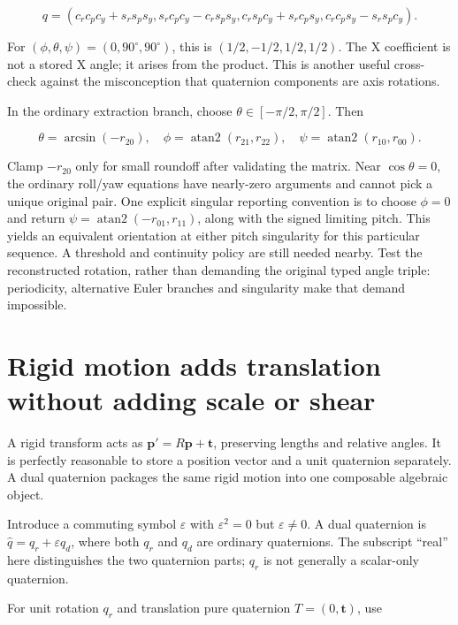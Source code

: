 \[
q=(c_rc_pc_y+s_rs_ps_y,
s_rc_pc_y-c_rs_ps_y,
c_rs_pc_y+s_rc_ps_y,
c_rc_ps_y-s_rs_pc_y).
\]

For \((\phi,\theta,\psi)=(0,90^\circ,90^\circ)\), this is \((1/2,-1/2,1/2,1/2)\). The X coefficient is not a stored X angle; it arises from the product. This is another useful cross-check against the misconception that quaternion components are axis rotations.

In the ordinary extraction branch, choose \(\theta\in[-\pi/2,\pi/2]\). Then

\[
\theta=\arcsin(-r_{20}),\quad
\phi=\operatorname{atan2}(r_{21},r_{22}),\quad
\psi=\operatorname{atan2}(r_{10},r_{00}).
\]

Clamp \(-r_{20}\) only for small roundoff after validating the matrix. Near \(\cos\theta=0\), the ordinary roll/yaw equations have nearly-zero arguments and cannot pick a unique original pair. One explicit singular reporting convention is to choose \(\phi=0\) and return \(\psi=\operatorname{atan2}(-r_{01},r_{11})\), along with the signed limiting pitch. This yields an equivalent orientation at either pitch singularity for this particular sequence. A threshold and continuity policy are still needed nearby. Test the reconstructed rotation, rather than demanding the original typed angle triple: periodicity, alternative Euler branches and singularity make that demand impossible.

\section{Rigid motion adds translation without adding scale or shear}\label{01-foundations-i-ch019-rigid-motion-adds-translation-without-adding-scale-or-shear}

A rigid transform acts as \(\mathbf p'=R\mathbf p+\mathbf t\), preserving lengths and relative angles. It is perfectly reasonable to store a position vector and a unit quaternion separately. A dual quaternion packages the same rigid motion into one composable algebraic object.

Introduce a commuting symbol \(\varepsilon\) with \(\varepsilon^2=0\) but \(\varepsilon\ne0\). A dual quaternion is \(\widehat q=q_r+\varepsilon q_d\), where both \(q_r\) and \(q_d\) are ordinary quaternions. The subscript ``real'' here distinguishes the two quaternion parts; \(q_r\) is not generally a scalar-only quaternion.

For unit rotation \(q_r\) and translation pure quaternion \(T=(0,\mathbf t)\), use


